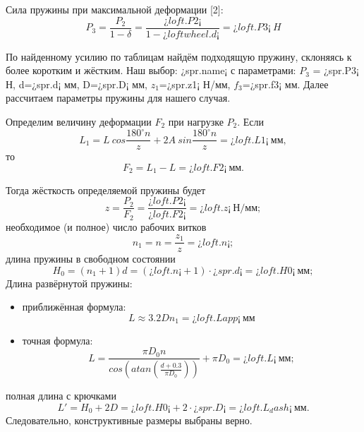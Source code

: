 \documentclass[14pt,a4paper,russian]{scrartcl}
\begin{document}
        Сила пружины при максимальной деформации [2]:
        \[ P_3 = \frac{P_2}{1-\delta} = \frac{¿loft.P2¡}{1-¿loftwheel.d¡} = ¿loft.P3¡\ H\]

        По найденному усилию по таблицам найдём подходящую пружину, склоняясь к более коротким
        и жёстким. Наш выбор: ¿spr.name¡ с параметрами: \( P_3 \) = ¿spr.P3¡ Н, d=¿spr.d¡ мм, 
        D=¿spr.D¡ мм, \( z_1 \)=¿spr.z1¡ Н/мм, \( f_3 \)=¿spr.f3¡ мм. Далее рассчитаем параметры
        пружины для нашего случая.

        Определим величину деформации \( F_2 \) при нагрузке \( P_2 \). Если 
        \[ L_1 =  L\ cos\frac{180^\circ n}{z} + 2A\ sin\frac{180^\circ n}{z} = ¿loft.L1¡\ \text{мм},\]
        то 
        \[ F_2 = L_1 - L = ¿loft.F2¡\ \text{мм}.\]

        Тогда жёсткость определяемой пружины будет
        \[ z = \frac{P_2}{F_2} = \frac{¿loft.P2¡}{¿loft.F2¡} = ¿loft.z¡\ \text{Н/мм}; \]
        необходимое (и полное) число рабочих витков
        \[ n_1 = n = \frac{z_1}{z} = ¿loft.n¡;\]
        длина пружины в свободном состоянии
        \[ H_0 = (n_1 + 1)d = (¿loft.n¡ + 1)\cdot ¿spr.d¡= ¿loft.H0¡\ \text{мм}; \]
        Длина развёрнутой пружины:
        \begin{itemize}
            \item приближённая формула:
                \[ L\approx 3.2Dn_1 = ¿loft.Lapp¡\ \text{мм} \]
            \item точная формула:
                \[ L = \frac{\pi D_0 n}{cos(atan(\frac{d+0.3}{\pi D_0 }))} + \pi D_0 = ¿loft.L¡\ \text{мм};\]
        \end{itemize}
        
        полная длина с крючками
        \[ L' = H_0 + 2D = ¿loft.H0¡ + 2\cdot ¿spr.D¡ = ¿loft.L_dash¡\ \text{мм}. \]
        Следовательно, конструктивные размеры выбраны верно.
\end{document}
